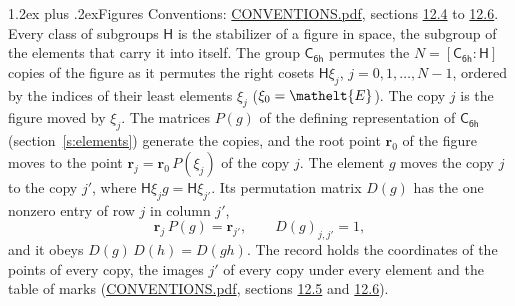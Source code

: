 \documentclass[10pt,a4paper]{article}
\makeatletter
\renewcommand\section{\@startsection{section}{1}{\z@}{-3ex plus -1ex minus -.2ex}%
  {1.2ex plus .2ex}{\normalfont\large\sffamily\bfseries\color{parttitle}}}
\numberwithin{equation}{section}
\newcommand{\eltfont}[1]{{\let\sigma\eltsigma\mathelt{#1}}}
\newcommand{\grp}[1]{\mathsf{#1}}
\newcommand{\cls}[1]{\eltfont{#1}}
\newcommand{\pointr}{\mathbf{r}}
\makeatother
\begin{document}
\section{Figures}\label{s:permutation}
Conventions: \href{../../CONVENTIONS.pdf}{CONVENTIONS.pdf}, sections \href{../../CONVENTIONS.pdf\#conv.12.4}{12.4} to \href{../../CONVENTIONS.pdf\#conv.12.6}{12.6}.
Every class of subgroups $\grp{H}$ is the stabilizer of a figure in space, the subgroup of the elements that carry it into itself. \label{n:local.orbit.size}\label{n:element.coset.least}\label{n:index.coset}The group $\grp{C_{6h}}$ permutes the $N = [\grp{C_{6h}} : \grp{H}]$ copies of the figure as it permutes the right cosets $\grp{H}\xi_j$, $j = 0, 1, \dots, N - 1$, ordered by the indices of their least elements $\xi_j$ ($\xi_0 = \cls{E}$). The copy $j$ is the figure moved by $\xi_j$. The matrices $P(g)$ of the defining representation of $\grp{C_{6h}}$ (section~\ref{s:elements}) generate the copies, and the root point $\pointr_0$ of the figure moves to the point $\pointr_j = \pointr_0\, P(\xi_j)$ of the copy $j$. \label{n:local.coset.image}The element $g$ moves the copy $j$ to the copy $j'$, where $\grp{H}\xi_j g = \grp{H}\xi_{j'}$. \label{n:local.matrix.permutation}Its permutation matrix $D(g)$ has the one nonzero entry of row $j$ in column $j'$,
\begin{equation}\label{e:perm.matrix}\pointr_j\, P(g) = \pointr_{j'}, \qquad D(g)_{j,j'} = 1,\end{equation}
and it obeys $D(g)\, D(h) = D(gh)$. The record holds the coordinates of the points of every copy, the images $j'$ of every copy under every element and the table of marks (\href{../../CONVENTIONS.pdf}{CONVENTIONS.pdf}, sections \href{../../CONVENTIONS.pdf\#conv.12.5}{12.5} and \href{../../CONVENTIONS.pdf\#conv.12.6}{12.6}).
\end{document}
